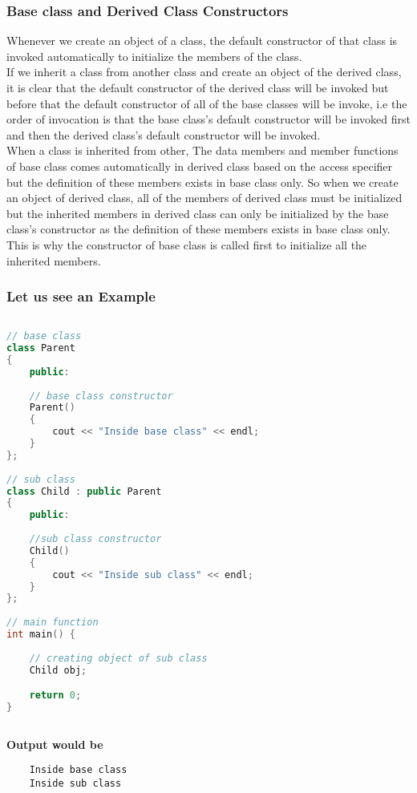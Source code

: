 \documentclass[11pt]{article}
\begin{document}
\subsubsection{Base class and Derived Class Constructors}
Whenever we create an object of a class, the default constructor of that class is invoked automatically to initialize the members of the class. \\

If we inherit a class from another class and create an object of the derived class, it is clear that the default constructor of the derived class will be invoked but before that the default constructor of all of the base classes will be invoke, i.e the order of invocation is that the base class's default constructor will be invoked first and then the derived class's default constructor will be invoked.\\

When a class is inherited from other, The data members and member functions of base class comes automatically in derived class based on the access specifier but the definition of these members exists in base class only. So when we create an object of derived class, all of the members of derived class must be initialized but the inherited members in derived class can only be initialized by the base class's constructor as the definition of these members exists in base class only. \\

This is why the constructor of base class is called first to initialize all the inherited members.

\subsubsection*{Let us see an Example}

\begin{lstlisting}[language = C++]
 
// base class
class Parent
{
    public:
     
    // base class constructor
    Parent()
    {
        cout << "Inside base class" << endl;
    }
};
 
// sub class
class Child : public Parent
{
    public:
     
    //sub class constructor
    Child()
    {
        cout << "Inside sub class" << endl;
    }
};
 
// main function
int main() {
      
    // creating object of sub class
    Child obj;

    return 0;
}
	
\end{lstlisting}
\textbf{Output would be}
\begin{verbatim}
	Inside base class
	Inside sub class
\end{verbatim}
\end{document}
